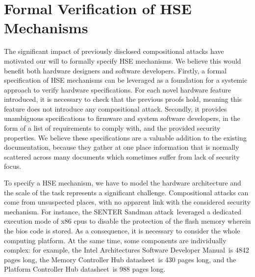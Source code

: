 \section{Formal Verification of HSE Mechanisms}
\label{sec:intro:verif}

The significant impact of previously disclosed compositional attacks  have
motivated our will to formally specify HSE mechanisms.
%
We believe this would benefit both hardware designers and software developers.
%
Firstly, a formal specification of HSE mechanisms can be leveraged as a
foundation for a systemic approach to verify hardware specifications.
%
For each novel hardware feature introduced, it is necessary to check that the
previous proofs hold, meaning this feature does not introduce any compositional
attack.
%
Secondly, it provides unambiguous specifications to firmware and system software
developers, in the form of a list of requirements to comply with, and the
provided security properties.
%
We believe these specifications are a valuable addition to the existing
documentation, because they gather at one place information that is normally
scattered across many documents which sometimes suffer from lack of security
focus. 

To specify a HSE mechanism, we have to model the hardware architecture and the
scale of the task represents a significant challenge.
%
Compositional attacks can come from unsuspected places, with no apparent link
with the considered security mechanism.
%
For instance, the SENTER Sandman attack\,\cite{kovah2015senter} leveraged a
dedicated execution mode of x86 \acp{cpu} to disable the protection of the flash
memory wherein the \ac{bios} code is stored.
%
As a consequence, it is necessary to consider the whole computing platform.
%
At the same time, some components are individually complex:
%
for example, the Intel Architectures Software Developer Manual\,\cite{intel2014manual} is
4842 pages long, 
%
the Memory Controller Hub datasheet\,\cite{intel2009mch} is 430 pages long, and
%
the Platform Controller Hub datasheet\,\cite{intel2012pch} is 988 pages long.

